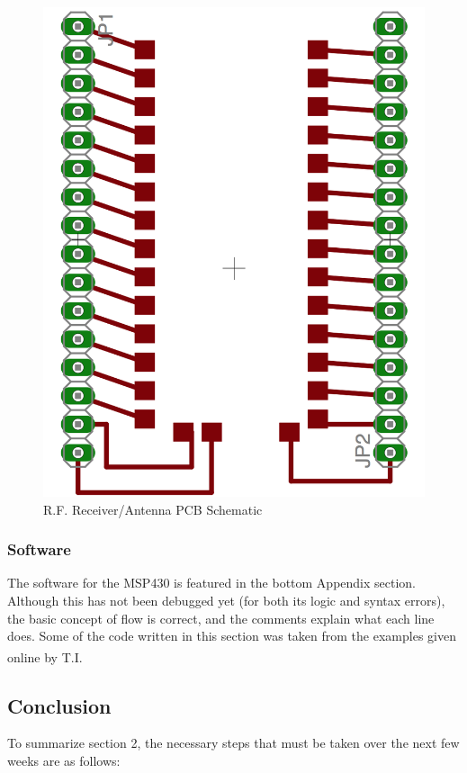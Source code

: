 \documentclass[letterpaper,10pt]{article}
\begin{document}
\begin{spacing}{1.15}
\begin{figure} [H]
	\centering
	\includegraphics[scale=0.25, angle = 270]{kh3-receiver-breakout.png}
	\caption{R.F. Receiver/Antenna PCB Schematic\label{fig:receiver-breakout}}
\end{figure}


\subsubsection{Software} \label{section-software}
The software for the MSP430 is featured in the bottom Appendix section. Although this has not been debugged yet (for both its logic and syntax errors), the basic concept of flow is correct, and the comments explain what each line does. Some of the code written in this section was taken from the examples given online by T.I.\textsuperscript{\cite{MSP-Example-Code}}
	


\subsection{Conclusion}
To summarize section 2, the necessary steps that must be taken over the next few weeks are as follows:


\end{spacing}
\end{document}
